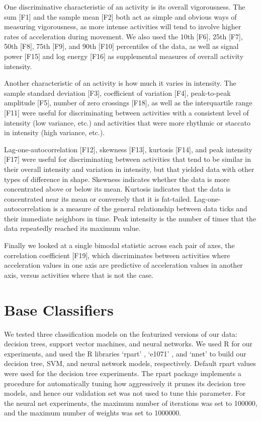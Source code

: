 
One discriminative characteristic of an activity is its overall vigorousness.
The sum [F1] and the sample mean [F2] both act as simple and obvious ways
of measuring vigorousness, as more intense activities will tend to involve
higher rates of acceleration during movement. We also used the 10th [F6], 25th [F7],
50th [F8], 75th [F9], and 90th [F10] percentiles of the data, as well as signal
power [F15] and log energy [F16] as supplemental measures of overall activity intensity.

Another characteristic of an activity is how much it varies in intensity. The sample standard
deviation [F3], coefficient of variation [F4], peak-to-peak amplitude [F5],
number of zero crossings [F18], as well as the
interquartile range [F11] were useful for discriminating between activities
with a consistent level of intensity (low variance, etc.) and activities that were more
rhythmic or staccato in intensity (high variance, etc.). 

Lag-one-autocorrelation [F12], skewness [F13], kurtosis [F14], and peak intensity [F17]
were useful for discriminating between
activities that tend to be similar in their overall intensity and variation in intensity,
but that yielded data with other types of difference in shape. Skewness indicates whether the data is
more concentrated above or below its mean. Kurtosis indicates that the data is concentrated
near its mean or conversely that it is fat-tailed. Lag-one-autocorrelation is a measure of
the general relationship between data ticks and their immediate neighbors in time. Peak
intensity is the number of times that the data repeatedly reached its maximum value. 

Finally we looked at a single bimodal statistic across each pair of axes, the correlation
coefficient [F19], which discriminates between activities where acceleration values in one axis
are predictive of acceleration values in another axis, versus activities where that is not the case.

\section{Base Classifiers}

We tested three classification models on the featurized versions of our data:
decision trees, support vector machines, and neural networks. We used R for our
experiments, and used the R libraries `rpart' \cite{rpart}, `e1071' \cite{svm},
and `nnet' \cite{nnet} to build
our decision tree, SVM, and neural network models, respectively. Default rpart values
were used for the decision tree experiments. The rpart package implements a
procedure for automatically tuning how aggressively it prunes its decision tree
models, and hence our validation set was not used to tune this parameter. 
For the neural net experiments, 
the maximum number of iterations was set to 100000, and the maximum number of
weights was set to 1000000.

